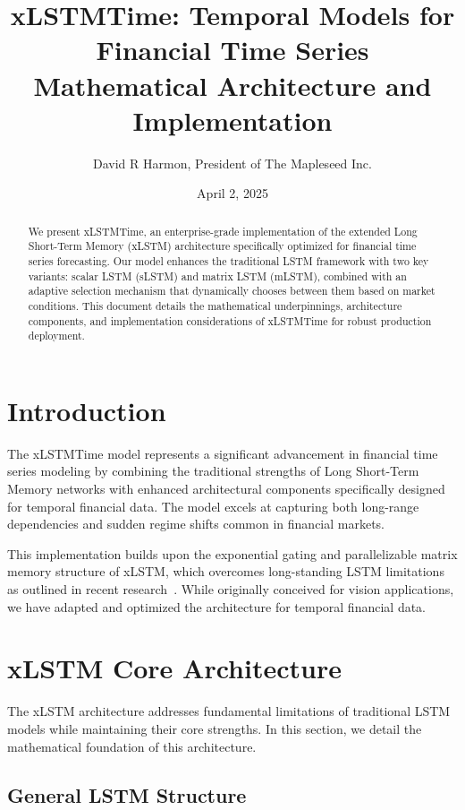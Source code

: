 \documentclass[11pt,a4paper]{article}
\title{xLSTMTime: Temporal Models for Financial Time Series\\
\large Mathematical Architecture and Implementation}
\author{David R Harmon, President of The Mapleseed Inc.}
\date{April 2, 2025}
\begin{document}
\maketitle

\begin{abstract}
We present xLSTMTime, an enterprise-grade implementation of the extended Long Short-Term Memory (xLSTM) architecture specifically optimized for financial time series forecasting. Our model enhances the traditional LSTM framework with two key variants: scalar LSTM (sLSTM) and matrix LSTM (mLSTM), combined with an adaptive selection mechanism that dynamically chooses between them based on market conditions. This document details the mathematical underpinnings, architecture components, and implementation considerations of xLSTMTime for robust production deployment.
\end{abstract}

\tableofcontents
\newpage

\section{Introduction}

The xLSTMTime model represents a significant advancement in financial time series modeling by combining the traditional strengths of Long Short-Term Memory networks with enhanced architectural components specifically designed for temporal financial data. The model excels at capturing both long-range dependencies and sudden regime shifts common in financial markets.

This implementation builds upon the exponential gating and parallelizable matrix memory structure of xLSTM, which overcomes long-standing LSTM limitations as outlined in recent research~\cite{hochreiter2023xlstm}. While originally conceived for vision applications, we have adapted and optimized the architecture for temporal financial data.

\section{xLSTM Core Architecture}

The xLSTM architecture addresses fundamental limitations of traditional LSTM models while maintaining their core strengths. In this section, we detail the mathematical foundation of this architecture.

\subsection{General LSTM Structure}
\end{document}
